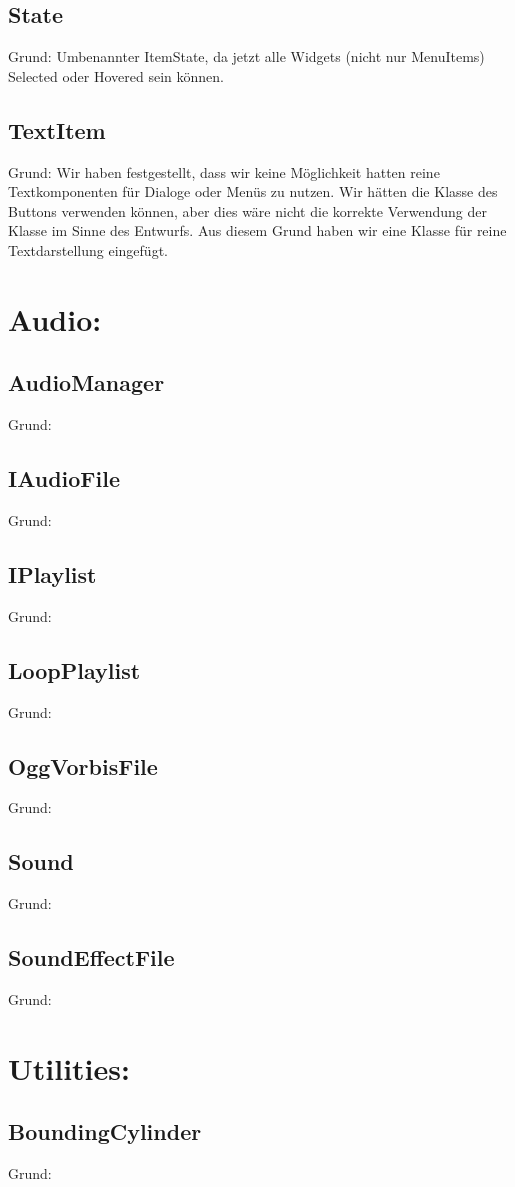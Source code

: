 \subsection{State}
Grund: Umbenannter ItemState, da jetzt alle Widgets (nicht nur MenuItems) Selected oder Hovered sein können.
\subsection{TextItem}
Grund: Wir haben festgestellt, dass wir keine Möglichkeit hatten reine Textkomponenten für Dialoge oder Menüs zu nutzen. Wir hätten die Klasse des Buttons verwenden können, aber dies wäre nicht die korrekte Verwendung der Klasse im Sinne des Entwurfs. Aus diesem Grund haben wir eine Klasse für reine Textdarstellung eingefügt.

\section{Audio:}
\subsection{AudioManager}
Grund:
\subsection{IAudioFile}
Grund:
\subsection{IPlaylist}
Grund:
\subsection{LoopPlaylist}
Grund:
\subsection{OggVorbisFile}
Grund:
\subsection{Sound}
Grund:
\subsection{SoundEffectFile}
Grund:

\section{Utilities:}
\subsection{BoundingCylinder}
Grund:
